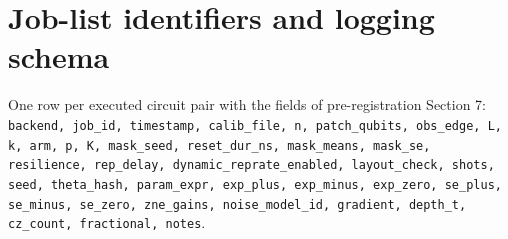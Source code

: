 \documentclass[aps,prxquantum,reprint,superscriptaddress,nofootinbib,longbibliography,amsmath,amssymb]{revtex4-2}
\begin{document}
\section{Job-list identifiers and logging schema}\label{app:schema}
One row per executed circuit pair with the fields of pre-registration Section 7: \texttt{backend, job\_id, timestamp, calib\_file, n, patch\_qubits, obs\_edge, L, k, arm, p, K, mask\_seed, reset\_dur\_ns, mask\_means, mask\_se, resilience, rep\_delay, dynamic\_reprate\_enabled, layout\_check, shots, seed, theta\_hash, param\_expr, exp\_plus, exp\_minus, exp\_zero, se\_plus, se\_minus, se\_zero, zne\_gains, noise\_model\_id, gradient, depth\_t, cz\_count, fractional, notes}.


\end{document}
